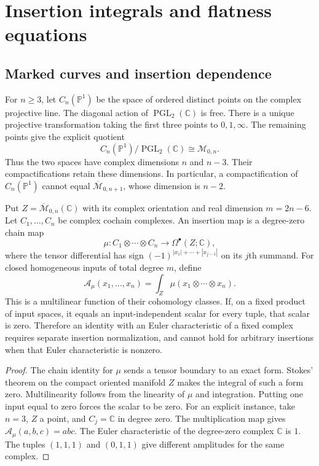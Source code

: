 \section{Insertion integrals and flatness equations}

\subsection{Marked curves and insertion dependence}

For $n\geq3$, let $C_n(\mathbb P^1)$ be the space of ordered distinct points on the complex projective line.
The diagonal action of $\operatorname{PGL}_2(\mathbb C)$ is free.
There is a unique projective transformation taking the first three points to $0,1,\infty$.
The remaining points give the explicit quotient
\[
 C_n(\mathbb P^1)/\operatorname{PGL}_2(\mathbb C)
 \cong\mathcal M_{0,n}.
\]
Thus the two spaces have complex dimensions $n$ and $n-3$.
Their compactifications retain these dimensions.
In particular, a compactification of $C_n(\mathbb P^1)$ cannot equal $\overline{\mathcal M}_{0,n+1}$, whose dimension is $n-2$.

\begin{proposition}
\label{thm:genus0-amplitude-bar}
Put $Z=\overline{\mathcal M}_{0,n}(\mathbb C)$ with its complex orientation and real dimension $m=2n-6$.
Let $C_1,\ldots,C_n$ be complex cochain complexes.
An insertion map is a degree-zero chain map
\[
 \mu:C_1\otimes\cdots\otimes C_n\longrightarrow
 \Omega^\bullet(Z;\mathbb C),
\]
where the tensor differential has sign $(-1)^{|x_1|+\cdots+|x_{j-1}|}$ on its $j$th summand.
For closed homogeneous inputs of total degree $m$, define
\[
 \mathcal A_\mu(x_1,\ldots,x_n)=\int_Z\mu(x_1\otimes\cdots\otimes x_n).
\]
This is a multilinear function of their cohomology classes.
If, on a fixed product of input spaces, it equals an input-independent scalar for every tuple, that scalar is zero.
Therefore an identity with an Euler characteristic of a fixed complex requires separate insertion normalization, and cannot hold for arbitrary insertions when that Euler characteristic is nonzero.
\end{proposition}

\begin{proof}
The chain identity for $\mu$ sends a tensor boundary to an exact form.
Stokes' theorem on the compact oriented manifold $Z$ makes the integral of such a form zero.
Multilinearity follows from the linearity of $\mu$ and integration.
Putting one input equal to zero forces the scalar to be zero.
For an explicit instance, take $n=3$, $Z$ a point, and $C_j=\mathbb C$ in degree zero.
The multiplication map gives $\mathcal A_\mu(a,b,c)=abc$.
The Euler characteristic of the degree-zero complex $\mathbb C$ is $1$.
The tuples $(1,1,1)$ and $(0,1,1)$ give different amplitudes for the same complex.
\end{proof}

